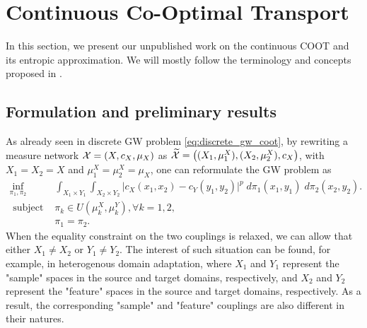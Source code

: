\section{Continuous Co-Optimal Transport} \label{sec:continuous_coot}

In this section, we present our unpublished work on the continuous COOT and its entropic approximation.
We will mostly follow the terminology and concepts proposed in \citep{Chowdhury21b}.

\subsection{Formulation and preliminary results}

As already seen in discrete GW problem \eqref{eq:discrete_gw_coot},
by rewriting a measure network $\mathcal X = (X, c_X, \mu_X)$ as
$\widetilde{\mathcal X} = \big((X_1, \mu_1^X), (X_2, \mu_2^X), c_X \big)$, with
$X_1 = X_2 = X$ and $\mu_1^X = \mu^X_2 = \mu_X$, one can reformulate the GW problem as
\begin{equation}
  \begin{split}
    \inf_{\pi_1, \pi_2}
    &\int_{X_1 \times Y_1} \int_{X_2 \times Y_2}
    \big\vert c_X(x_1, x_2) - c_Y(y_1, y_2) \big\vert^p \; d\pi_1(x_1, y_1) \; d\pi_2(x_2, y_2). \\
    \text{ subject to: } &\pi_k \in U(\mu_k^X, \mu_k^Y), \forall k = 1,2, \\
    &\pi_1 = \pi_2.
  \end{split}
\end{equation}
When the equality constraint on the two couplings is relaxed,
we can allow that either $X_1 \neq X_2$ or $Y_1 \neq Y_2$.
The interest of such situation can be found, for example, in heterogenous domain adaptation,
where $X_1$ and $Y_1$ represent the "sample" spaces in the source and target domains, respectively,
and $X_2$ and $Y_2$ represent the "feature" spaces in the source and target domains, respectively.
As a result, the corresponding "sample" and "feature" couplings are also different in their natures.


